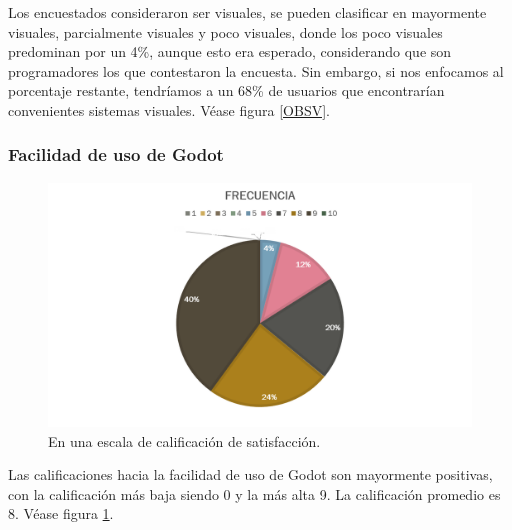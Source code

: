 \documentclass[]{article}
\begin{document}
Los encuestados consideraron ser visuales, se pueden clasificar en mayormente visuales, parcialmente visuales y poco visuales, donde los poco visuales predominan por un 4\%, aunque esto era esperado, considerando que son programadores los que contestaron la encuesta. Sin embargo, si nos enfocamos al porcentaje restante, tendr\'iamos a un 68\% de usuarios que encontrar\'ian convenientes sistemas visuales. V\'ease figura \ref{OBSV}.

\subsubsection{Facilidad de uso de Godot}
\begin{figure}[H]
	
	\centering
	\includegraphics[width=1\textwidth]{Encuesta_facilidad_godot}
	\caption{En una escala de calificaci\'on de satisfacci\'on.}
	\label{GODOT}
	
\end{figure}

Las calificaciones hacia la facilidad de uso de Godot son mayormente positivas, con la calificaci\'on m\'as baja siendo 0 y la m\'as alta 9. La calificaci\'on promedio es 8.  V\'ease figura \ref{GODOT}.
\end{document}
